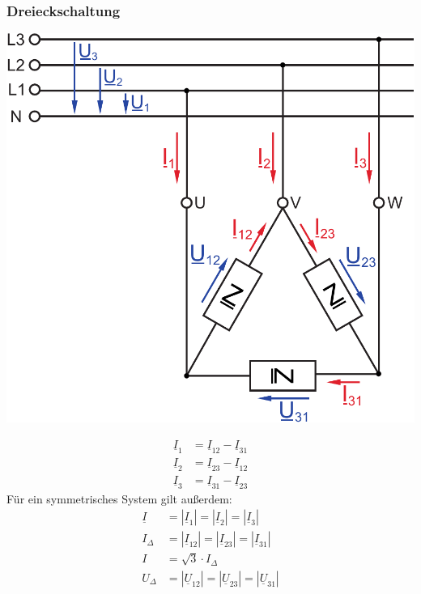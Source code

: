 \documentclass[a4paper,twocolumn,10pt]{article}
\begin{document}
\subsubsection{Dreieckschaltung}
\begin{center}
\includegraphics[width=0.8\columnwidth]{Grafiken/Dreieckschaltung}
\end{center}
\begin{equation*}
\begin{split}
\underline{I}_1&=\underline{I}_{12}-\underline{I}_{31}\\
\underline{I}_2&=\underline{I}_{23}-\underline{I}_{12}\\
\underline{I}_3&=\underline{I}_{31}-\underline{I}_{23}
\end{split}
\end{equation*}
Für ein symmetrisches System gilt außerdem:
\begin{equation*}
\begin{split}
\underline{I}&=|\underline{I}_1|=|\underline{I}_2|=|\underline{I}_3|\\
I_{\Delta}&=|\underline{I}_{12}|=|\underline{I}_{23}|=|\underline{I}_{31}|\\
I&=\sqrt{3}\cdot I_{\Delta}\\
U_{\Delta}&=|\underline{U}_{12}|=|\underline{U}_{23}|=|\underline{U}_{31}|
\end{split}
\end{equation*}
\end{document}

